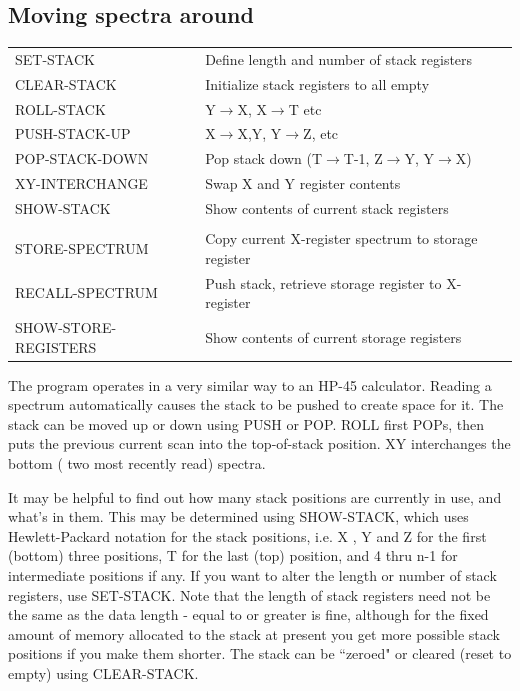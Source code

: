 \documentclass[11pt,twoside]{report}
\begin{document}
\subsection{Moving spectra around}

\begin{tabular}{ll}
SET-STACK              & Define length and number of stack registers\\
CLEAR-STACK            & Initialize stack registers to all empty\\
ROLL-STACK             & Y$\rightarrow$X, X$\rightarrow$T etc\\
PUSH-STACK-UP          & X$\rightarrow$X,Y, Y$\rightarrow$Z, etc\\
POP-STACK-DOWN         & \parbox[t]{4.5in}{
                         Pop stack down (T$\rightarrow$T-1, Z$\rightarrow$Y, 
                         Y$\rightarrow$X)}\\
XY-INTERCHANGE         & Swap X and Y register contents\\
SHOW-STACK             & Show contents of current stack registers\\
\\
STORE-SPECTRUM         & Copy current X-register spectrum to storage register\\
RECALL-SPECTRUM        & Push stack, retrieve storage register to X-register\\
SHOW-STORE-REGISTERS   & Show contents of current storage registers\\
\end{tabular}

The program operates in a very similar way to an HP-45
calculator. Reading a spectrum automatically causes
the stack to be pushed to create space for it. The stack can be
moved up or down using PUSH or POP. ROLL first POPs, then puts the previous
current scan into the top-of-stack position. XY interchanges the bottom (\ie
two most recently read) spectra. 

It may be helpful to find out how many stack positions are currently in use,
and what's in them. This may be determined using SHOW-STACK, which uses
Hewlett-Packard notation for the stack positions, i.e. X
,
Y
and Z 
for the first (bottom) three positions, T for the last
(top) position, and 4 thru n-1 for intermediate positions if any. If you want
to alter the length or number of stack registers, use SET-STACK. Note that the
length of stack registers need not be the same
as the data length - equal to or greater is fine, although for the fixed amount
of memory allocated to the stack at present you get more possible stack
positions if you make them shorter. The stack can be ``zeroed" or cleared
(reset to empty) using CLEAR-STACK. 
\end{document}
